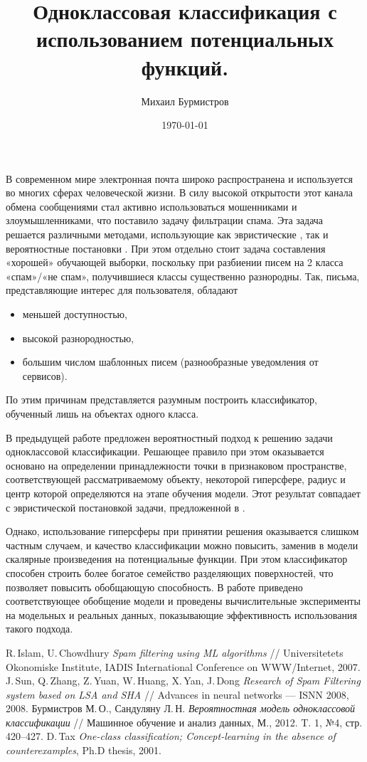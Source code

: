 \documentclass[12pt,a4paper,oneside]{article}
\begin{document}
	\title{Одноклассовая классификация с использованием потенциальных функций.}
	\author{Михаил Бурмистров}
	\date{\today}
	\maketitle

В современном мире электронная почта широко распространена и используется во многих сферах человеческой жизни. 
В силу высокой открытости этот канала обмена сообщениями стал активно использоваться мошенниками и злоумышленниками, что поставило задачу фильтрации спама. 
Эта задача решается различными методами, использующие как эвристические \cite{Islam2007, Sun2008}, так и вероятностные постановки . 
При этом отдельно стоит задача составления «хорошей» обучающей выборки, поскольку при разбиении писем на 2 класса «спам»/«не спам», получившиеся классы существенно разнородны. Так, письма, представляющие интерес для пользователя, обладают
\begin{itemize}
		\item меньшей доступностью,
		\item высокой разнородностью,
		\item большим числом шаблонных писем (разнообразные уведомления от сервисов).
\end{itemize}
По этим причинам представляется разумным построить классификатор, обученный лишь на объектах одного класса. 

В предыдущей работе \cite{JMLDA2012no4} предложен вероятностный подход к решению задачи одноклассовой классификации. 
Решающее правило при этом оказывается основано на определении принадлежности точки в признаковом пространстве, соответствующей рассматриваемому объекту, некоторой гиперсфере, радиус и центр которой определяются на этапе обучения модели. 
Этот результат совпадает с эвристической постановкой задачи, предложенной в \cite{Tax2001}. 

Однако, использование гиперсферы при принятии решения оказывается слишком частным случаем, и качество классификации можно повысить, заменив в модели скалярные произведения на потенциальные функции. 
При этом классификатор способен строить более богатое семейство разделяющих поверхностей, что позволяет повысить обобщающую способность. 
В работе приведено соответствующее обобщение модели и проведены вычислительные эксперименты на модельных и реальных данных, показывающие эффективность использования такого подхода. 

\begin{thebibliography}{99}
	 R.\,Islam, U.\,Chowdhury \textit{Spam filtering using ML algorithms} // Universitetets Okonomiske Institute, IADIS International Conference on WWW/Internet, 2007.
	 J.\,Sun, Q.\,Zhang, Z.\,Yuan, W.\,Huang, X.\,Yan, J.\,Dong \textit{Research of Spam Filtering system based on LSA and SHA} // Advances in neural networks --- ISNN 2008, 2008.
	 Бурмистров М.\,О., Сандуляну Л.\,Н. \textit{Вероятностная модель одноклассовой классификации} // Машинное обучение и анализ данных, М., 2012. T. 1, №4, стр. 420--427.
	 D.\,Tax \textit{One-class classification; Concept-learning in the absence of
	counterexamples}, Ph.D thesis, 2001.
\end{thebibliography}
\end{document}
